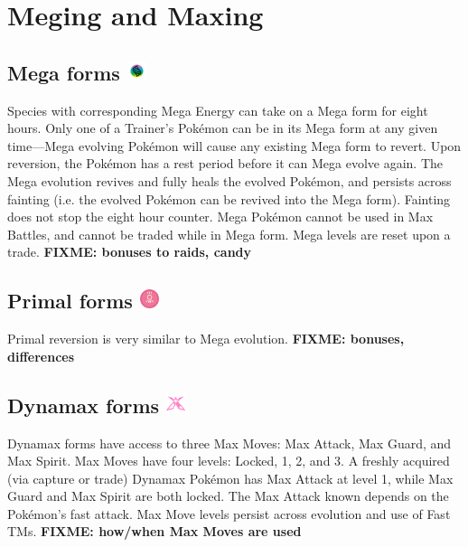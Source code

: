 \chapter{Meging and Maxing}
\label{chap:megmax}

\section{Mega forms \includegraphics[width=1em,height=1em]{images/mega.png}}
\label{section:mega}
Species with corresponding Mega Energy can take on a Mega form for eight hours.
Only one of a Trainer's Pokémon can be in its Mega form at any given time---Mega
  evolving Pokémon will cause any existing Mega form to revert.
Upon reversion, the Pokémon has a rest period before it can Mega evolve again.
The Mega evolution revives and fully heals the evolved Pokémon, and persists across
  fainting (i.e. the evolved Pokémon can be revived into the Mega form).
Fainting does not stop the eight hour counter.
Mega Pokémon cannot be used in Max Battles, and cannot be traded while in Mega form.
Mega levels are reset upon a trade.
\textbf{FIXME: bonuses to raids, candy}


\section{Primal forms \includegraphics[width=1em,height=1em]{images/primal.png}}
\label{section:primal}
Primal reversion is very similar to Mega evolution.
\textbf{FIXME: bonuses, differences}


\section{Dynamax forms \includegraphics[width=1em,height=1em]{images/dynamax.png}}
\label{section:dmax}
Dynamax forms have access to three Max Moves: Max Attack, Max Guard, and Max Spirit.
Max Moves have four levels: Locked, 1, 2, and 3.
A freshly acquired (via capture or trade) Dynamax Pokémon has Max Attack at level 1,
  while Max Guard and Max Spirit are both locked.
The Max Attack known depends on the Pokémon's fast attack.
Max Move levels persist across evolution and use of Fast TMs.
\textbf{FIXME: how/when Max Moves are used}


